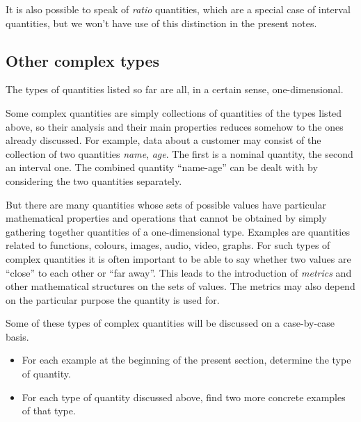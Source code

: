 \documentclass[
  a4paper,
  DIV=11,
  numbers=noendperiod,
  oneside]{scrreprt}
\begin{document}
It is also possible to speak of \emph{ratio} quantities, which are a
special case of interval quantities, but we won't have use of this
distinction in the present notes.

\hypertarget{other-complex-types}{%
\subsection{Other complex types}\label{other-complex-types}}

The types of quantities listed so far are all, in a certain sense,
one-dimensional.

Some complex quantities are simply collections of quantities of the
types listed above, so their analysis and their main properties reduces
somehow to the ones already discussed. For example, data about a
customer may consist of the collection of two quantities \emph{name},
\emph{age}. The first is a nominal quantity, the second an interval one.
The combined quantity ``name-age'' can be dealt with by considering the
two quantities separately.

But there are many quantities whose sets of possible values have
particular mathematical properties and operations that cannot be
obtained by simply gathering together quantities of a one-dimensional
type. Examples are quantities related to functions, colours, images,
audio, video, graphs. For such types of complex quantities it is often
important to be able to say whether two values are ``close'' to each
other or ``far away''. This leads to the introduction of \emph{metrics}
and other mathematical structures on the sets of values. The metrics may
also depend on the particular purpose the quantity is used for.

Some of these types of complex quantities will be discussed on a
case-by-case basis.

\begin{tcolorbox}[enhanced jigsaw, titlerule=0mm, opacitybacktitle=0.6, toprule=.15mm, toptitle=1mm, opacityback=0, left=2mm, colframe=quarto-callout-caution-color-frame, arc=.35mm, bottomtitle=1mm, leftrule=.75mm, colbacktitle=quarto-callout-caution-color!10!white, coltitle=black, title={\faIcon{user-edit} Exercises}, rightrule=.15mm, breakable, colback=white, bottomrule=.15mm]

\begin{itemize}
\item
  For each example at the beginning of the present section, determine
  the type of quantity.
\item
  For each type of quantity discussed above, find two more concrete
  examples of that type.
\end{itemize}

\end{tcolorbox}
\end{document}
